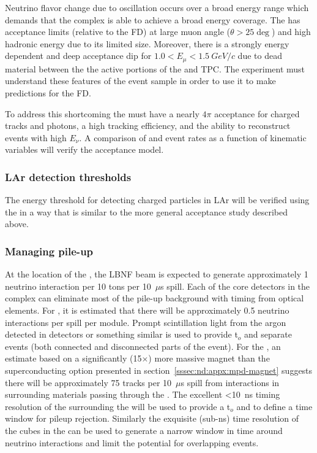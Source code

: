 Neutrino flavor change due to oscillation occurs over a broad energy range which demands that the   complex is able to achieve a broad energy coverage. The \larnd has acceptance limits (relative to the FD) at large muon angle ($\theta > 25\deg$) and high hadronic energy due to its limited size. Moreover, there is a strongly energy dependent and deep acceptance dip for $1.0 < E_\mu < 1.5~GeV/c$ due to dead material between the the active portions of the \larnd and  TPC. The experiment must understand these features of the \larnd event sample in order to use it to make predictions for the FD. 

To address this shortcoming the  must have a nearly $4\pi$ acceptance for charged tracks and photons, a high tracking efficiency, and the ability to reconstruct events with high $E_\nu$. A comparison of  and \larnd event rates as a function of kinematic variables will verify the \larnd acceptance model. 



\subsubsection{LAr detection thresholds}

The energy threshold for detecting charged particles in LAr will be verified using the  in a way that is similar to the more general \larnd acceptance study described above. 

\subsubsection{Managing pile-up}
At the location of the  , the LBNF beam is expected to generate approximately 1 neutrino interaction per 10 tons per 10~$\mu$s spill.   
Each of the core detectors in the  complex can eliminate most of the pile-up background with timing from optical elements. For , it is estimated that there will be approximately 0.5 neutrino interactions per spill per  module. Prompt scintillation light from the argon detected in  detectors or something similar is used to provide t$_{o}$ and separate events (both connected and disconnected parts of the event).  For the , an estimate based on a significantly (15$\times$) more massive magnet than the superconducting option presented in section~\ref{sssec:nd:appx:mpd-magnet} suggests there will be approximately 75 tracks per 10~$\mu$s spill from interactions in surrounding materials passing through the .  The excellent <10~ns timing resolution of the  surrounding the  will be used to provide a t$_{o}$ and to define a time window for pileup rejection.  Similarly the exquisite (sub-ns) time resolution of the cubes in the  can be used to generate a narrow window in time around neutrino interactions and limit the potential for overlapping events.  




